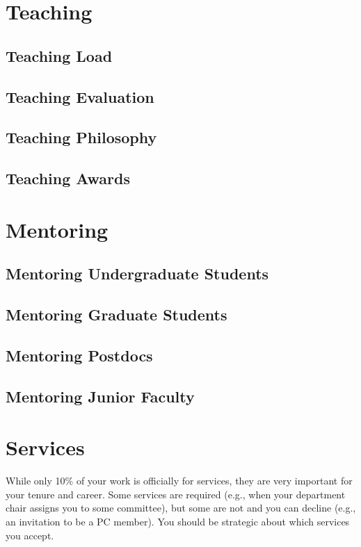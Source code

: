 \documentclass[oneside,11pt,dvipsnames]{book}
\begin{document}
\chapter{Teaching}
\section{Teaching Load}
\section{Teaching Evaluation}
\section{Teaching Philosophy}
\section{Teaching Awards}



\chapter{Mentoring}
\section{Mentoring Undergraduate Students}
\section{Mentoring Graduate Students}
\section{Mentoring Postdocs}
\section{Mentoring Junior Faculty}

\chapter{Services}

While only 10\% of your work is officially for services, they are very important for your tenure and career.
Some services are required (e.g., when your department chair assigns you to some committee), but some are not and you can decline (e.g., an invitation to be a PC member).  You should be strategic about which services you accept.
\end{document}
